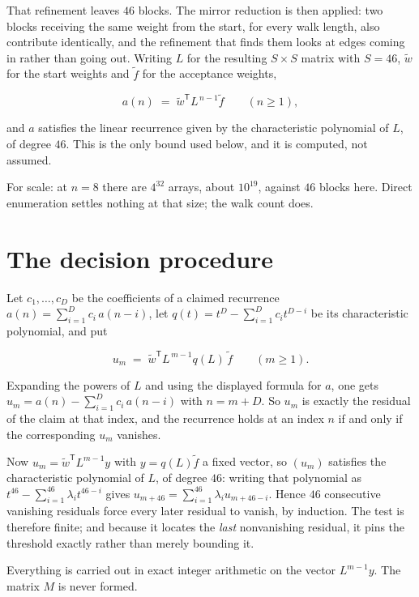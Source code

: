\documentclass[11pt]{article}
\theoremstyle{definition}
\begin{document}
That refinement leaves $46$ blocks. The mirror reduction is then applied: two blocks receiving the same weight from the start, for every walk length, also contribute identically, and the refinement that finds them looks at edges coming in rather than going out. Writing $L$ for the resulting $S \times S$ matrix with $S = 46$, $\tilde w$ for the start weights and $\tilde f$ for the acceptance weights,

\[a(n) \;=\; \tilde w^{\mathsf T} L^{\,n-1} \tilde f \qquad (n \ge 1),\]

and $a$ satisfies the linear recurrence given by the characteristic polynomial of $L$, of degree $46$. This is the only bound used below, and it is computed, not assumed.

For scale: at $n = 8$ there are $4^{32}$ arrays, about $10^{19}$, against $46$ blocks here. Direct enumeration settles nothing at that size; the walk count does.

\section{The decision procedure}

Let $c_1,\dots,c_D$ be the coefficients of a claimed recurrence $a(n) = \sum_{i=1}^{D} c_i\,a(n-i)$, let $q(t) = t^{D} - \sum_{i=1}^{D} c_i t^{D-i}$ be its characteristic polynomial, and put

\[u_m \;=\; \tilde w^{\mathsf T} L^{\,m-1} q(L)\,\tilde f \qquad (m \ge 1).\]

Expanding the powers of $L$ and using the displayed formula for $a$, one gets $u_m = a(n) - \sum_{i=1}^{D} c_i\,a(n-i)$ with $n = m + D$. So $u_m$ is exactly the residual of the claim at that index, and the recurrence holds at an index $n$ if and only if the corresponding $u_m$ vanishes.

Now $u_m = \tilde w^{\mathsf T} L^{m-1} y$ with $y = q(L)\tilde f$ a fixed vector, so $(u_m)$ satisfies the characteristic polynomial of $L$, of degree $46$: writing that polynomial as $t^{46} - \sum_{i=1}^{46} \lambda_i t^{46-i}$ gives $u_{m+46} = \sum_{i=1}^{46} \lambda_i u_{m+46-i}$. Hence $46$ consecutive vanishing residuals force every later residual to vanish, by induction. The test is therefore finite; and because it locates the {\itshape last} nonvanishing residual, it pins the threshold exactly rather than merely bounding it.

Everything is carried out in exact integer arithmetic on the vector $L^{m-1}y$. The matrix $M$ is never formed.
\end{document}
